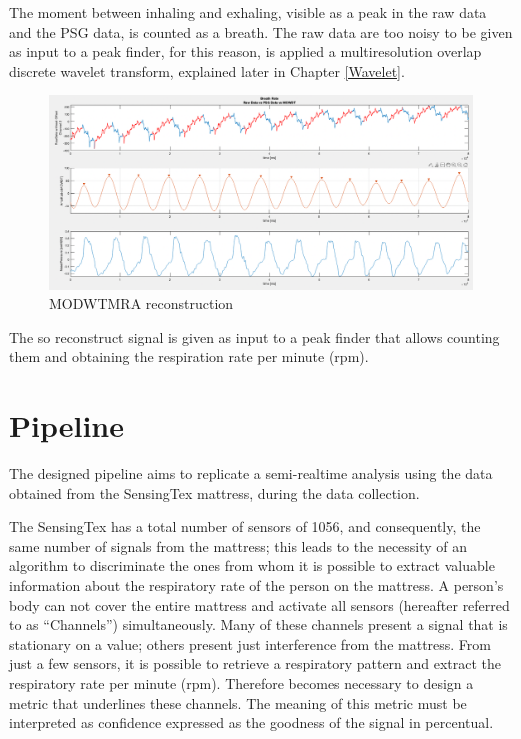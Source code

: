 \vspace*{0.5cm}

The moment between inhaling and exhaling, visible as a peak in the raw data and the PSG data, is counted as a breath. The raw data are too noisy to be given as input to a peak finder, for this reason, is applied a multiresolution overlap discrete wavelet transform, explained later in Chapter \ref{Wavelet}.

\vspace*{0.5cm}

\begin{figure}[H]
    \centering    
    \includegraphics[width=\textwidth]{img/sensomative_manu.png}
    \caption{MODWTMRA reconstruction}
    \label{fig:seonsmativeDataManu}
 
\end{figure}

The so reconstruct signal is given as input to a peak finder that allows counting them and obtaining the respiration rate per minute (rpm).

\section{Pipeline}\label{cap:pipeline}
The designed pipeline aims to replicate a semi-realtime analysis using the data obtained from the SensingTex mattress, during the data collection. \newline

The SensingTex has a total number of sensors of 1056, and consequently, the same number of signals from the mattress; this leads to the necessity of an algorithm to discriminate the ones from whom it is possible to extract valuable information about the respiratory rate of the person on the mattress. A person's body can not cover the entire mattress and activate all sensors (hereafter referred to as “Channels”) simultaneously.
Many of these channels present a signal that is stationary on a value; others present just interference from the mattress. From just a few sensors, it is possible to retrieve a respiratory pattern and extract the respiratory rate per minute (rpm). Therefore becomes necessary to design a metric that underlines these channels. The meaning of this metric must be interpreted as confidence expressed as the goodness of the signal in percentual.

